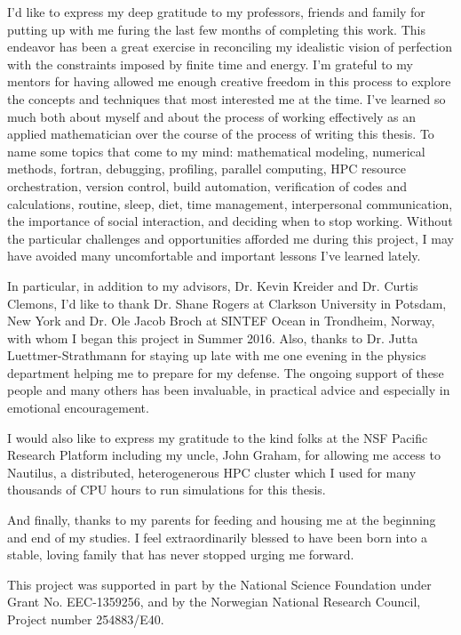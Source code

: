 \begin{acknowledgements}
I'd like to express my deep gratitude to my professors, friends and family for putting up with me furing the last few months of completing this work.
This endeavor has been a great exercise in reconciling my idealistic vision of perfection with the constraints imposed by finite time and energy.
I'm grateful to my mentors for having allowed me enough creative freedom in this process to explore the concepts and techniques that most interested me at the time.
I've learned so much both about myself and about the process of working effectively as an applied mathematician over the course of the process of writing this thesis.
To name some topics that come to my mind: mathematical modeling, numerical methods, fortran, debugging, profiling, parallel computing, HPC resource orchestration, version control, build automation, verification of codes and calculations, routine, sleep, diet, time management, interpersonal communication, the importance of social interaction, and deciding when to stop working.
Without the particular challenges and opportunities afforded me during this project, I may have avoided many uncomfortable and important lessons I've learned lately.

In particular, in addition to my advisors, Dr. Kevin Kreider and Dr. Curtis Clemons, I'd like to thank Dr. Shane Rogers at Clarkson University in Potsdam, New York and Dr. Ole Jacob Broch at SINTEF Ocean in Trondheim, Norway, with whom I began this project in Summer 2016.
Also, thanks to Dr. Jutta Luettmer-Strathmann for staying up late with me one evening in the physics department helping me to prepare for my defense.
The ongoing support of these people and many others has been invaluable, in practical advice and especially in emotional encouragement.

I would also like to express my gratitude to the kind folks at the NSF Pacific Research Platform including my uncle, John Graham, for allowing me access to Nautilus, a distributed, heterogenerous HPC cluster which I used for many thousands of CPU hours to run simulations for this thesis.

And finally, thanks to my parents for feeding and housing me at the beginning and end of my studies.
I feel extraordinarily blessed to have been born into a stable, loving family that has never stopped urging me forward.

This project was supported in part by the National Science
Foundation under Grant No. EEC-1359256, and by the Norwegian National Research
Council, Project number 254883/E40.

\end{acknowledgements}






